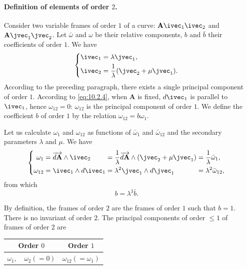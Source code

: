 \paragraph{Definition of elements of order $2$.}
\label{sec:135}
Consider two variable frames of order $1$ of a curve: $\mathbf{A}\ivec_{1}\ivec_{2}$ and $\mathbf{A}\jvec_{1}\jvec_{2}$. Let $\bar\omega$ and $\omega$ be their relative components, $b$ and $\bar b$ their coefficients of order $1$. We have
\begin{equation}
  \label{eq:10.2.4}
  \left\{
    \begin{aligned}
      \ivec_{1}&=\lambda\jvec_{1},\\
      \ivec_{2}&=\frac{1}{\lambda}(\jvec_{2}+\mu\jvec_{1}).
    \end{aligned}
  \right.
\end{equation}
According to the preceding paragraph, there exists a single principal component of order $1$. According to \eqref{eq:10.2.4}, when $\mathbf{A}$ is fixed, $d\ivec_{1}$ is parallel to $\ivec_{1}$, hence $\omega_{12}=0$: $\omega_{12}$ is the principal component of order $1$. We define the coefficient $b$ of order $1$ by the relation $\omega_{12}=b\omega_{1}$.

Let us calculate $\omega_{1}$ and $\omega_{12}$ as functions of $\bar\omega_{1}$ and $\bar\omega_{12}$ and the secondary parameters $\lambda$ and $\mu$. We have
\begin{equation}
  \label{eq:10.2.5}
  \left\{
    \begin{alignedat}{20}
      \omega_{1}&=\overrightarrow{d\mathbf{A}}\wedge\ivec_{2}&&=\frac{1}{\lambda}\overrightarrow{d\mathbf{A}}\wedge(\jvec_{2}+\mu\jvec_{1})&&=\frac{1}{\lambda}\bar\omega_{1},\\
      \omega_{12}&=\ivec_{1}\wedge d\ivec_{1}&&=\lambda^{2}\jvec_{1}\wedge d\jvec_{1}&&=\lambda^{2}\bar\omega_{12},
    \end{alignedat}
  \right.
\end{equation}
from which
\begin{equation}
  \label{eq:10.2.6}
  b=\lambda^{3}\bar b.
\end{equation}

By definition, the frames of order $2$ are the frames of order $1$ such that $b=1$. There is no invariant of order $2$. The principal components of order $\le 1$ of frames of order $2$ are
\begin{center}  
\begin{tabular}{|c|c|}
  \hline
  Order $0$&Order $1$\\
  \hline
  $\omega_{1},\quad\omega_{2}(=0)$&$\omega_{12}(=\omega_{1})$\\
  \hline
\end{tabular}
\end{center}


